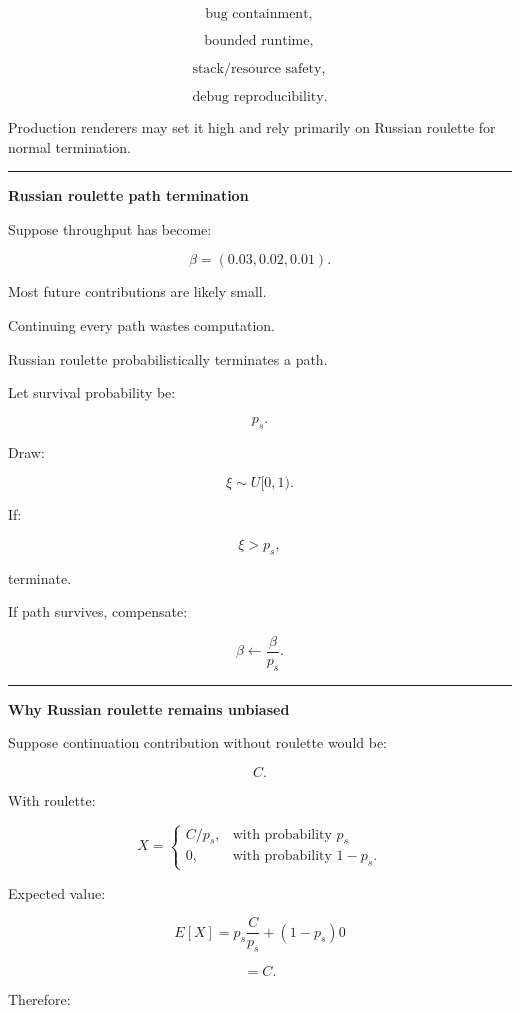 \[
\text{bug containment},
\]

\[
\text{bounded runtime},
\]

\[
\text{stack/resource safety},
\]

\[
\text{debug reproducibility}.
\]

Production renderers may set it high and rely primarily on Russian roulette for normal termination.

\begin{center}\rule{0.5\linewidth}{0.5pt}\end{center}

\textbf{Russian roulette path termination}

Suppose throughput has become:

\[
\beta=(0.03,0.02,0.01).
\]

Most future contributions are likely small.

Continuing every path wastes computation.

Russian roulette probabilistically terminates a path.

Let survival probability be:

\[
p_s.
\]

Draw:

\[
\xi\sim U[0,1).
\]

If:

\[
\xi>p_s,
\]

terminate.

If path survives, compensate:

\[
\boxed{
\beta
\leftarrow
\frac{\beta}{p_s}.
}
\]

\begin{center}\rule{0.5\linewidth}{0.5pt}\end{center}

\textbf{Why Russian roulette remains unbiased}

Suppose continuation contribution without roulette would be:

\[
C.
\]

With roulette:

\[
X=
\begin{cases}
C/p_s, & \text{with probability }p_s\\
0, & \text{with probability }1-p_s.
\end{cases}
\]

Expected value:

\[
E[X]
=
p_s\frac{C}{p_s}
+
(1-p_s)0
\]

\[
=
C.
\]

Therefore:

